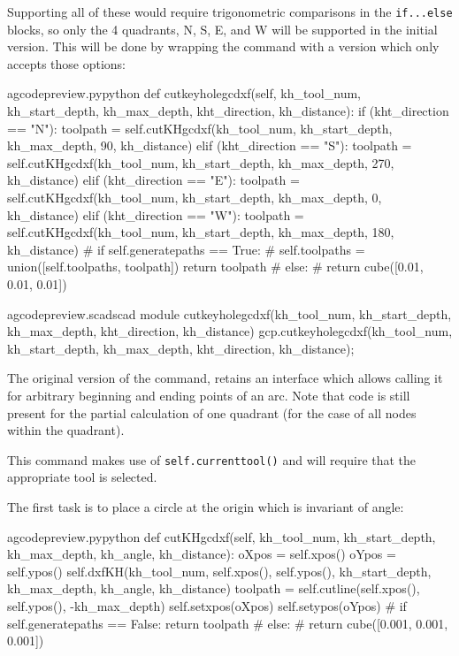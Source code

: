 \documentclass{ltxdoc}
\begin{document}
Supporting all of these would require trigonometric comparisons in the \verb|if...else| blocks, so only the 4 quadrants, N, S, E, and W will be supported in the initial version. This will be done by wrapping the command with a version which only accepts those options: 

\lstset{firstnumber=\thegcpy}
\begin{writecode}{a}{gcodepreview.py}{python}
    def cutkeyholegcdxf(self, kh_tool_num, kh_start_depth, kh_max_depth, kht_direction, kh_distance):   
        if (kht_direction == "N"): 
            toolpath = self.cutKHgcdxf(kh_tool_num, kh_start_depth, kh_max_depth, 90, kh_distance)
        elif (kht_direction == "S"):
            toolpath = self.cutKHgcdxf(kh_tool_num, kh_start_depth, kh_max_depth, 270, kh_distance)
        elif (kht_direction == "E"):
            toolpath = self.cutKHgcdxf(kh_tool_num, kh_start_depth, kh_max_depth, 0, kh_distance)
        elif (kht_direction == "W"):
            toolpath = self.cutKHgcdxf(kh_tool_num, kh_start_depth, kh_max_depth, 180, kh_distance)
#        if self.generatepaths == True:
#            self.toolpaths = union([self.toolpaths, toolpath])
        return toolpath
#        else:
#            return cube([0.01, 0.01, 0.01])

\end{writecode}
\addtocounter{gcpy}{15}

\lstset{firstnumber=\thegcpscad}
\begin{writecode}{a}{gcodepreview.scad}{scad}
module cutkeyholegcdxf(kh_tool_num, kh_start_depth, kh_max_depth, kht_direction, kh_distance){
    gcp.cutkeyholegcdxf(kh_tool_num, kh_start_depth, kh_max_depth, kht_direction, kh_distance);
}

\end{writecode}
\addtocounter{gcpscad}{4}

The original version of the command,  retains an interface which allows calling it for arbitrary beginning and ending points of an arc. Note that code is still present for the partial calculation of one quadrant (for the case of all nodes within the quadrant). 

This command makes use of \verb|self.currenttool()| and will require that the appropriate tool is selected.

The first task is to place a circle at the origin which is invariant of angle:
 
\lstset{firstnumber=\thegcpy}
\begin{writecode}{a}{gcodepreview.py}{python}
    def cutKHgcdxf(self, kh_tool_num, kh_start_depth, kh_max_depth, kh_angle, kh_distance):
        oXpos = self.xpos()
        oYpos = self.ypos()
        self.dxfKH(kh_tool_num, self.xpos(), self.ypos(), kh_start_depth, kh_max_depth, kh_angle, kh_distance)
        toolpath = self.cutline(self.xpos(), self.ypos(), -kh_max_depth)
        self.setxpos(oXpos)
        self.setypos(oYpos)
#        if self.generatepaths == False:
        return toolpath
#        else: 
#            return cube([0.001, 0.001, 0.001])

\end{writecode}
\addtocounter{gcpy}{12}
\end{document}
